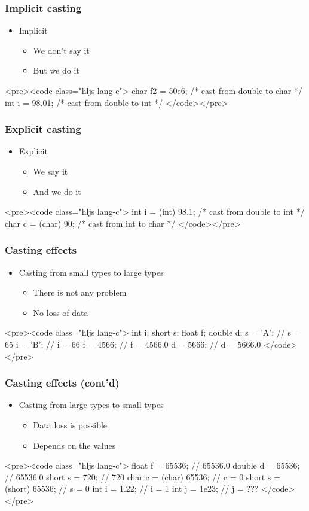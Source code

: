 \documentclass{../c-lecture}
\begin{document}
\begin{frame}
  \frametitle{Implicit casting}
  \begin{itemize}
    \item Implicit
    \begin{itemize}
      \item We don’t say it
      \item But we do it
    \end{itemize}
  \end{itemize}
  <pre><code class="hljs lang-c">
char f2 = 50e6; /* cast from double to char */
int i = 98.01; /* cast from double to int */
  </code></pre>
\end{frame}
\begin{frame}
  \frametitle{Explicit casting}
  \begin{itemize}
    \item Explicit
    \begin{itemize}
      \item We say it
      \item And we do it
    \end{itemize}
  \end{itemize}
  <pre><code class="hljs lang-c">
int i = (int) 98.1; /* cast from double to int */
char c = (char) 90; /* cast from int to char */
  </code></pre>
\end{frame}
\begin{frame}
  \frametitle{Casting effects}
  \begin{itemize}
    \item Casting from small types to large types
    \begin{itemize}
      \item There is not any problem
      \item No loss of data
    \end{itemize}
  \end{itemize}
  <pre><code class="hljs lang-c">
int i;
short s;
float f;
double d;
s = 'A'; // s = 65
i = 'B'; // i = 66
f = 4566; // f = 4566.0
d = 5666; // d = 5666.0
  </code></pre>
\end{frame}
\begin{frame}
  \frametitle{Casting effects (cont’d)}
  \begin{itemize}
    \item Casting from large types to small types
    \begin{itemize}
      \item Data loss is possible
      \item Depends on the values
    \end{itemize}
  \end{itemize}
  <pre><code class="hljs lang-c">
float f = 65536; // 65536.0
double d = 65536; // 65536.0
short s = 720; // 720
char c = (char) 65536; // c = 0
short s = (short) 65536; // s = 0
int i = 1.22; // i = 1
int j = 1e23; // j = ???
  </code></pre>
\end{frame}
\end{document}
